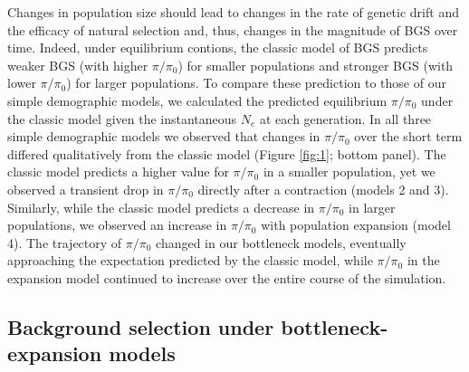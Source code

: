 \documentclass[9pt,twocolumn,twoside]{rilabRxiv}
\begin{document}
Changes in population size should lead to changes in the rate of genetic drift and the efficacy of natural selection and, thus, changes in the magnitude of BGS over time.
Indeed, under equilibrium contions, the classic model of BGS \citep{nordborg1996effect} predicts weaker BGS (with higher $\pi/\pi_0$) for smaller populations and stronger BGS (with lower $\pi/\pi_0$) for larger populations.
To compare these prediction to those of our simple demographic models, we calculated the predicted equilibrium $\pi/\pi_0$ under the classic model given the instantaneous $N_e$ at each generation.
In all three simple demographic models we observed that changes in $\pi/\pi_0$ over the short term differed qualitatively from the classic model  (Figure \ref{fig:1}; bottom panel).
The classic model predicts a higher value for $\pi/\pi_0$ in a smaller population, yet we observed a transient drop in $\pi/\pi_0$ directly after a contraction (models 2 and 3).
Similarly, while the classic model predicts a decrease in $\pi/\pi_0$ in larger populations, we observed an increase in $\pi/\pi_0$ with population expansion (model 4).
The trajectory of $\pi/\pi_0$ changed in our bottleneck models, eventually approaching the expectation predicted by the classic model, while $\pi/\pi_0$ in the expansion model continued to increase over the entire course of the simulation.

\subsection{Background selection under bottleneck-expansion models}
\end{document}
